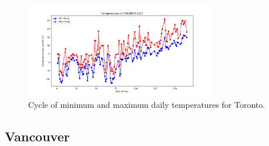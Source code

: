\documentclass{article}
\begin{document}
\begin{enumerate}
\begin{center}
\begin{figure}[!h]
\includegraphics[width=3.25in]{../Plot/Toronto/day_vs_temp_2017.png}

\caption{Cycle of minimum and maximum daily temperatures for Toronto.}

\end{figure}
\end{center}



\end{enumerate}



\subsection{ \bf Vancouver }
\end{document}

